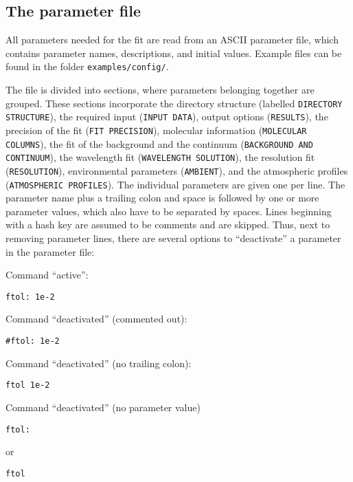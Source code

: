 \subsection{The parameter file}\label{sec:paramfile}
All parameters needed for the fit are read from an ASCII parameter file, which
contains parameter names, descriptions, and initial values. Example files can
be found in the folder {\tt examples/config/}.

The file is divided into sections, where parameters belonging together are
grouped. These sections incorporate the directory structure (labelled
{\tt DIRECTORY STRUCTURE}), the required input ({\tt INPUT DATA}), output
options ({\tt RESULTS}), the precision of the fit ({\tt FIT PRECISION}),
molecular information ({\tt MOLECULAR COLUMNS}), the fit of the background and
the continuum ({\tt BACKGROUND AND CONTINUUM}), the wavelength fit
({\tt WAVE\-LENGTH SOLUTION}), the resolution fit ({\tt RESOLUTION}),
environmental parameters ({\tt AMBIENT}), and the
atmospheric profiles ({\tt ATMO\-SPHERIC PROFILES}). The individual parameters
are given one per line. The parameter name plus a trailing colon and space is
followed by one or more parameter values, which also have to be separated by
spaces. Lines beginning with a hash key are assumed to be comments and are
skipped. Thus, next to removing parameter lines, there are several options to
``deactivate'' a parameter in the parameter file:

Command ``active'':
\begin{verbatim}
ftol: 1e-2
\end{verbatim}

Command ``deactivated'' (commented out):
\begin{verbatim}
#ftol: 1e-2
\end{verbatim}

Command ``deactivated'' (no trailing colon):
\begin{verbatim}
ftol 1e-2
\end{verbatim}

Command ``deactivated'' (no parameter value)
\begin{verbatim}
ftol:
\end{verbatim}
or
\begin{verbatim}
ftol
\end{verbatim}

